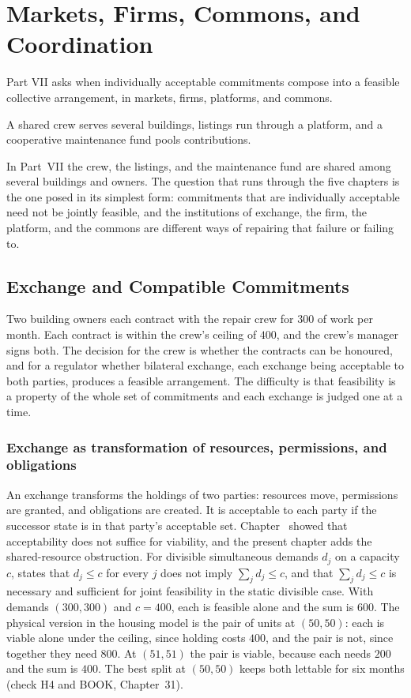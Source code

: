 \part{Markets, Firms, Commons, and Coordination}
\label{part:VII}

Part VII asks when individually acceptable commitments compose into a feasible collective arrangement, in markets, firms, platforms, and commons.

\begin{housing}A shared crew serves several buildings, listings run through a platform, and a cooperative maintenance fund pools contributions.\end{housing}


In Part~VII the crew, the listings, and the maintenance fund are shared among several buildings and owners. The question that runs through the five chapters is the one  posed in its simplest form: commitments that are individually acceptable need not be jointly feasible, and the institutions of exchange, the firm, the platform, and the commons are different ways of repairing that failure or failing to.

\chapter{Exchange and Compatible Commitments}\label{ch:31}

Two building owners each contract with the repair crew for $300$ of work per month. Each contract is within the crew's ceiling of $400$, and the crew's manager signs both. The decision for the crew is whether the contracts can be honoured, and for a regulator whether bilateral exchange, each exchange being acceptable to both parties, produces a feasible arrangement. The difficulty is that feasibility is a property of the whole set of commitments and each exchange is judged one at a time.

\section{Exchange as transformation of resources, permissions, and obligations}

An exchange transforms the holdings of two parties: resources move, permissions are granted, and obligations are created. It is acceptable to each party if the successor state is in that party's acceptable set. Chapter~ showed that acceptability does not suffice for viability, and the present chapter adds the shared-resource obstruction. For divisible simultaneous demands $d_j$ on a capacity $c$,  states that $d_j\le c$ for every $j$ does not imply $\sum_jd_j\le c$, and that $\sum_jd_j\le c$ is necessary and sufficient for joint feasibility in the static divisible case. With demands $(300,300)$ and $c=400$, each is feasible alone and the sum is $600$. The physical version in the housing model is the pair of units at $(50,50)$: each is viable alone under the ceiling, since holding costs $400$, and the pair is not, since together they need $800$. At $(51,51)$ the pair is viable, because each needs $200$ and the sum is $400$. The best split at $(50,50)$ keeps both lettable for six months (check H4 and BOOK, Chapter~31).

